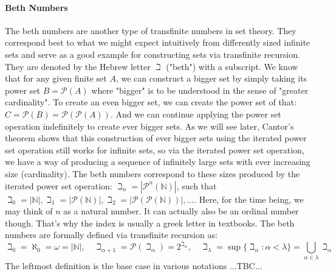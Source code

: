 \paragraph{Beth Numbers}
The beth numbers are another type of transfinite numbers in set theory. They correspond best to what we might expect intuitively from differently sized infinite sets and serve as a good example for constructing sets via transfinite recursion. They are denoted by the Hebrew letter $\beth$ ("beth") with a subscript. We know that for any given finite set $A$, we can construct a bigger set by simply taking its power set $B = \mathcal{P}(A)$ where "bigger" is to be understood in the sense of "greater cardinality". To create an even bigger set, we can create the power set of that: $C = \mathcal{P}(B) = \mathcal{P}(\mathcal{P}(A))$. And we can continue applying the power set operation indefinitely to create ever bigger sets. As we will see later, Cantor's theorem shows that this construction of ever bigger sets using the iterated power set operation still works for infinite sets, so via the iterated power set operation, we have a way of producing a sequence of infinitely large sets with ever increasing size (cardinality). The beth numbers correspond to these sizes produced by the iterated power set operation: $\beth_n = |\mathcal{P}^n (\mathbb{N})|$, such that $\beth_0 = |\mathbb{N}|, \beth_1 = |\mathcal{P} (\mathbb{N})|, \beth_2 = |\mathcal{P}(\mathcal{P} (\mathbb{N}))|, \ldots$. Here, for the time being, we may think of $n$ as a natural number. It can actually also be an ordinal number though. That's why the index is usually a greek letter in textbooks. The beth numbers are formally defined via transfinite recursion as:
\begin{equation}
\beth_0 = \aleph_0 
        = \omega 
        = |\mathbb{N}|, \quad
\beth_{\alpha + 1} = \mathcal{P}(\beth_{\alpha}) 
                   = 2^{\beth_{\alpha}}, \quad
\beth_{\lambda} = \sup \{ \beth_{\alpha} : \alpha < \lambda \} 
                = \bigcup_{\alpha \in \lambda} \beth_{\alpha} 
\end{equation}
The leftmost definition is the base case in various notations
...TBC...



